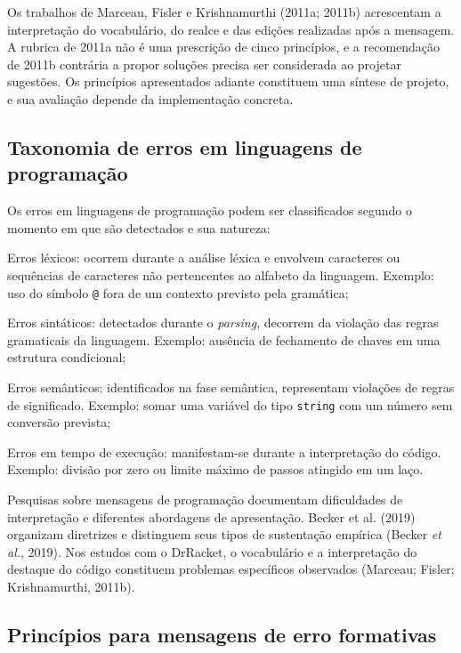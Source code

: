 \documentclass[
    12pt
    ,oneside
    ,a4paper
    ,chapter=TITLE
    ,section=TITLE
    ,sumario=abnt-6027-2012]{abntex2}
\newcommand{\citeMarceauOnward}{(Marceau; Fisler; Krishnamurthi, 2011b)}
\newcommand{\citeBecker}{(Becker \textit{et al.}, 2019)}
\begin{document}
Os trabalhos de Marceau, Fisler e Krishnamurthi (2011a; 2011b) acrescentam a
interpretação do vocabulário, do realce e das edições realizadas após a mensagem.
A rubrica de 2011a não é uma prescrição de cinco princípios, e a recomendação
de 2011b contrária a propor soluções precisa ser considerada ao projetar sugestões.
Os princípios apresentados adiante constituem uma síntese de projeto, e sua
avaliação depende da implementação concreta.

\subsection{Taxonomia de erros em linguagens de programação}

Os erros em linguagens de programação podem ser classificados segundo o momento em que são
detectados e sua natureza:

\begin{alineas}
    \item Erros léxicos: ocorrem durante a análise léxica e envolvem caracteres ou sequências de caracteres não pertencentes ao alfabeto da linguagem. Exemplo: uso do símbolo \texttt{@} fora de um contexto previsto pela gramática;
    \item Erros sintáticos: detectados durante o \textit{parsing}, decorrem da violação das regras gramaticais da linguagem. Exemplo: ausência de fechamento de chaves em uma estrutura condicional;
    \item Erros semânticos: identificados na fase semântica, representam violações de regras de significado. Exemplo: somar uma variável do tipo \texttt{string} com um número sem conversão prevista;
    \item Erros em tempo de execução: manifestam-se durante a interpretação do código. Exemplo: divisão por zero ou limite máximo de passos atingido em um laço.
\end{alineas}

Pesquisas sobre mensagens de programação documentam dificuldades de interpretação
e diferentes abordagens de apresentação. Becker et al. (2019) organizam diretrizes
e distinguem seus tipos de sustentação empírica \citeBecker. Nos estudos
com o DrRacket, o vocabulário e a interpretação do destaque do código constituem
problemas específicos observados \citeMarceauOnward.

\subsection{Princípios para mensagens de erro formativas}
\end{document}
